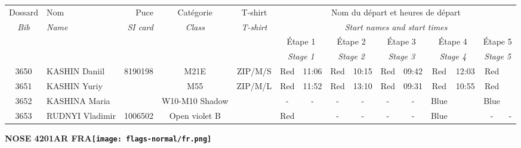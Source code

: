 \documentclass{report}
\begin{document}
  \begin{longtable}{|c|l|r|c|c|*{5}{cc|}}
    Dossard & Nom  & Puce    & Catégorie & T-shirt & \multicolumn{10}{c|}{Nom du départ et heures de départ} \\
    \itshape Bib     & \itshape Name & \itshape SI card & \itshape Class  & \itshape  T-shirt  & \multicolumn{10}{c|}{\itshape Start names and start times} \\
    \hline
    & & & & & \multicolumn{2}{c|}{Étape 1} & \multicolumn{2}{c|}{Étape 2} & \multicolumn{2}{c|}{Étape 3} & \multicolumn{2}{c|}{Étape 4} & \multicolumn{2}{c|}{Étape 5} \\
    & & & & & \multicolumn{2}{c|}{\itshape Stage 1} & \multicolumn{2}{c|}{\itshape Stage 2} & \multicolumn{2}{c|}{\itshape Stage 3} & \multicolumn{2}{c|}{\itshape Stage 4} & \multicolumn{2}{c|}{\itshape Stage 5} \\
    \hline
    3650 & KASHIN Daniil & 8190198 & M21E & ZIP/M/S & Red & 11:06 & Red & 10:15 & Red & 09:42 & Red & 12:03 & Red &  \\
    3651 & KASHIN Yuriy &  & M55 & ZIP/M/L & Red & 11:52 & Red & 13:10 & Red & 09:31 & Red & 10:55 & Red &  \\
    3652 & KASHINA Maria &  & W10-M10 Shadow &   & - &  - & - &  - & - &  - & Blue &   & Blue &  \\
    3653 & RUDNYI Vladimir & 1006502 & Open violet B &   & Red &   & - &  - & - &  - & Blue &   & - &  -\\
  \end{longtable}
\newpage
  \Huge \centering \bfseries NOSE 4201AR FRA\normalfont \footnotesize \sffamily \hfill \texttt{[image: flags-normal/fr.png]} \newline 
\end{document}
